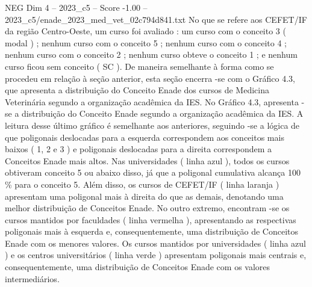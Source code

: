 \begin{textsample}{NEG Dim 4 – 2023\_c5 – Score -1.00 – 2023\_c5/enade\_2023\_med\_vet\_02c794d841.txt}
No que se refere aos CEFET/IF da região Centro-Oeste, um curso foi avaliado : um curso com o conceito 3 ( modal ) ; nenhum curso com o conceito 5 ; nenhum curso com o conceito 4 ; nenhum curso com o conceito 2 ; nenhum curso obteve o conceito 1 ; e nenhum curso ficou sem conceito ( SC ).
De maneira semelhante à forma como se procedeu em relação à seção anterior, esta seção encerra -se com o Gráfico 4.3, que apresenta a distribuição do Conceito Enade dos cursos de Medicina Veterinária segundo a organização acadêmica da IES.
No Gráfico 4.3, apresenta -se a distribuição do Conceito Enade segundo a organização acadêmica da IES.
A leitura desse último gráfico é semelhante aos anteriores, seguindo -se a lógica de que poligonais deslocadas para a esquerda correspondem aos conceitos mais baixos ( 1, 2 e 3 ) e poligonais deslocadas para a direita correspondem a Conceitos Enade mais altos.
Nas universidades ( linha azul ), todos os cursos obtiveram conceito 5 ou abaixo disso, já que a poligonal cumulativa alcança 100 \% para o conceito 5.
Além disso, os cursos de CEFET/IF ( linha laranja ) apresentam uma poligonal mais à direita do que as demais, denotando uma melhor distribuição de Conceitos Enade.
No outro extremo, encontram -se os cursos mantidos por faculdades ( linha vermelha ), apresentando as respectivas poligonais mais à esquerda e, consequentemente, uma distribuição de Conceitos Enade com os menores valores.
Os cursos mantidos por universidades ( linha azul ) e os centros universitários ( linha verde ) apresentam poligonais mais centrais e, consequentemente, uma distribuição de Conceitos Enade com os valores intermediários.

\end{textsample}
